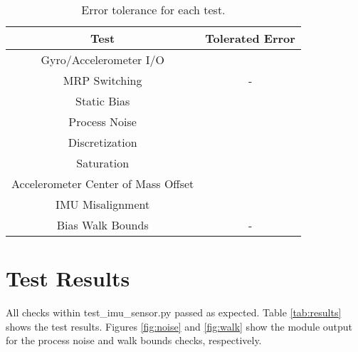 \begin{table}[H]
	\caption{Error tolerance for each test.}
	\label{tab:errortol}
	\centering \fontsize{10}{10}\selectfont
	\begin{tabular}{ c | c } %
		\hline
		\textbf{Test}   									& \textbf{Tolerated Error} 						  \\ \hline
		Gyro/Accelerometer I/O 						& 		   \\ \hline
		MRP Switching 									& - 														   \\ \hline
		Static Bias 										&  	 		       \\ \hline
		Process Noise 									& 			      \\ \hline
		Discretization 				  					   &   \\ \hline
		Saturation 											&  	  \\ \hline
		Accelerometer Center of Mass Offset &  \\ \hline
		IMU Misalignment 								&  \\ \hline
		Bias Walk Bounds 								& - 														   \\ \hline
	\end{tabular}
\end{table}


\section{Test Results}
All checks within test\_imu\_sensor.py passed as expected. Table \ref{tab:results} shows the test results. Figures \ref{fig:noise} and \ref{fig:walk} show the module output for the process noise and walk bounds checks, respectively.

